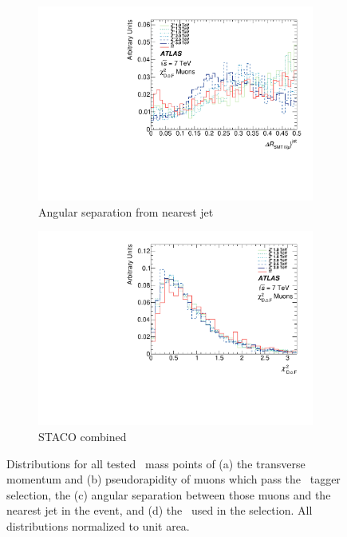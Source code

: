 \begin{figure}[htbp]
  \begin{subfigure}{0.48\textwidth}
    \includegraphics[width=\textwidth]{PartBoosted/Plots/h_smt_jet_dr.pdf}
    \caption{Angular separation from nearest jet} \label{fig:BoostedControlSMTdr}
  \end{subfigure}
  \begin{subfigure}{0.48\textwidth}
    \includegraphics[width=\textwidth]{PartBoosted/Plots/h_smt_chi2.pdf}
    \caption{STACO combined \xsd} \label{fig:BoostedControlSMTchi2}
  \end{subfigure}

  \caption{Distributions for all tested \Zprime\ mass points of (a) the transverse momentum and (b) pseudorapidity of muons which pass the \xsm\ tagger selection, the (c) angular separation between those muons and the nearest jet in the event, and (d) the \xsm\ used in the selection. All distributions normalized to unit area.} \label{fig:BoostedControlSMT}
\end{figure}


